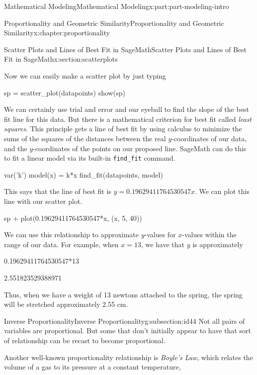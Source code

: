 \documentclass[oneside,10pt,]{book}
\newcommand{\mono}[1]{\texttt{#1}}
\numberwithin{equation}{section}
\begin{document}
\begin{partptx}{Mathematical Modeling}{}{Mathematical Modeling}{}{}{x:part:part-modeling-intro}
\begin{chapterptx}{Proportionality and Geometric Similarity}{}{Proportionality and Geometric Similarity}{}{}{x:chapter:proportionality}
\begin{sectionptx}{Scatter Plots and Lines of Best Fit in SageMath}{}{Scatter Plots and Lines of Best Fit in SageMath}{}{}{x:section:scatterplots}
\par
Now we can easily make a scatter plot by just typing%
\begin{sageinput}
sp = scatter_plot(datapoints)
show(sp)
\end{sageinput}
We can certainly use trial and error and our eyeball to find the slope of the best fit line for this data.  But there is a mathematical criterion for best fit called \emph{least squares}. This principle gets a line of best fit by using calculus to minimize the sums of the squares of the distances between the real \(y\)-coordinates of our data, and the \(y\)-coordinates of the points on our proposed line. SageMath can do this to fit a linear model via its built-in \mono{find\_fit} command.%
\begin{sageinput}
var('k')
model(x) = k*x
find_fit(datapoints, model)
\end{sageinput}
\begin{sageoutput}
[k == 0.19629411764530547]
\end{sageoutput}
This says that the line of best fit is \(y = 0.19629411764530547x\).  We can plot this line with our scatter plot.%
\begin{sageinput}
sp + plot(0.19629411764530547*x, (x, 5, 40))
\end{sageinput}
We can use this relationship to approximate \(y\)-values for \(x\)-values within the range of our data. For example, when \(x = 13\), we have that \(y\) is approximately%
\begin{sageinput}
0.19629411764530547*13
\end{sageinput}
\begin{sageoutput}
2.551823529388971
\end{sageoutput}
Thus, when we have a weight of 13 newtons attached to the spring, the spring will be stretched approximately 2.55 cm.%
%
%
\typeout{************************************************}
\typeout{************************************************}
%
\begin{subsectionptx}{Inverse Proportionality}{}{Inverse Proportionality}{}{}{g:subsection:id44}
Not all pairs of variables are proportional.  But some that don't initially appear to have that sort of relationship can be recast to become proportional.%
\par
Another well-known proportionality relationship is \emph{Boyle's Law}, which relates the volume of a gas to its pressure at a constant temperature,%
%
\begin{equation*}

\end{equation*}
\end{subsectionptx}
\end{sectionptx}
\end{chapterptx}
\end{partptx}
\end{document}
